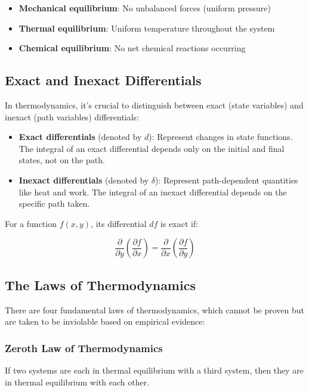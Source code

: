\documentclass{article}
\theoremstyle{definition}
\begin{document}
\begin{itemize}
    \item \textbf{Mechanical equilibrium}: No unbalanced forces (uniform pressure)
    \item \textbf{Thermal equilibrium}: Uniform temperature throughout the system
    \item \textbf{Chemical equilibrium}: No net chemical reactions occurring
\end{itemize}

\subsection{Exact and Inexact Differentials}

In thermodynamics, it's crucial to distinguish between exact (state variables) and inexact (path variables) differentials:

\begin{itemize}
    \item \textbf{Exact differentials} (denoted by $d$): Represent changes in state functions. The integral of an exact differential depends only on the initial and final states, not on the path.
    \item \textbf{Inexact differentials} (denoted by $\delta$): Represent path-dependent quantities like heat and work. The integral of an inexact differential depends on the specific path taken.
\end{itemize}

For a function $f(x,y)$, its differential $df$ is exact if:

\[
\frac{\partial}{\partial y}\left(\frac{\partial f}{\partial x}\right) = \frac{\partial}{\partial x}\left(\frac{\partial f}{\partial y}\right)
\]

\subsection{The Laws of Thermodynamics}

There are four fundamental laws of thermodynamics, which cannot be proven but are taken to be inviolable based on empirical evidence:

\subsubsection{Zeroth Law of Thermodynamics}

If two systems are each in thermal equilibrium with a third system, then they are in thermal equilibrium with each other.
\end{document}
